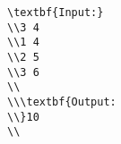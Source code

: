 \begin{verbatim}
\textbf{Input:}
\\3 4
\\1 4
\\2 5
\\3 6
\\
\\\textbf{Output:
\\}10
\\\end{verbatim}